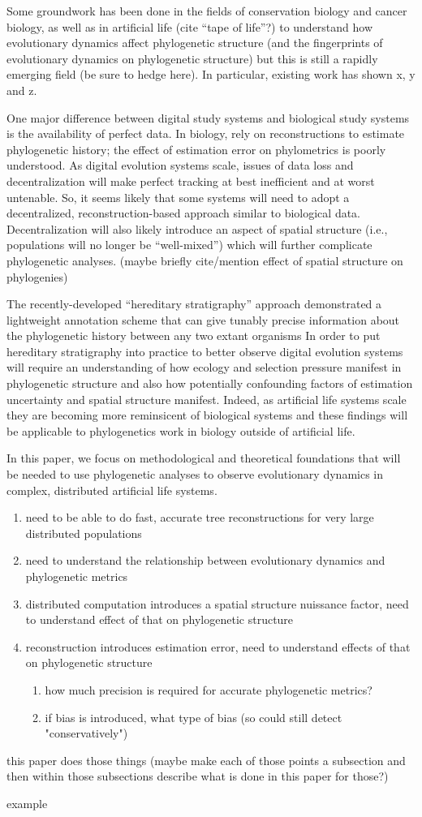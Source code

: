 Some groundwork has been done in the fields of conservation biology and cancer biology, as well as in artificial life (cite ``tape of life''?) to understand how evolutionary dynamics affect phylogenetic structure (and the fingerprints of evolutionary dynamics on phylogenetic structure) but this is still a rapidly emerging field (be sure to hedge here).
In particular, existing work has shown x, y and z.

One major difference between digital study systems and biological study systems is the availability of perfect data.
In biology, rely on reconstructions to estimate phylogenetic history; the effect of estimation error on phylometrics is poorly understood.
As digital evolution systems scale, issues of data loss and decentralization will make perfect tracking at best inefficient and at worst untenable.
So, it seems likely that some systems will need to adopt a decentralized, reconstruction-based approach similar to biological data.
Decentralization will also likely introduce an aspect of spatial structure (i.e., populations will no longer be ``well-mixed'') which will further complicate phylogenetic analyses.
(maybe briefly cite/mention effect of spatial structure on phylogenies)

The recently-developed ``hereditary stratigraphy'' approach demonstrated a lightweight annotation scheme that can give tunably precise information about the phylogenetic history between any two extant organisms
In order to put hereditary stratigraphy into practice to better observe digital evolution systems will require an understanding of how ecology and selection pressure manifest in phylogenetic structure and also how potentially confounding factors of estimation uncertainty and spatial structure manifest.
Indeed, as artificial life systems scale they are becoming more reminsicent of biological systems and these findings will be applicable to phylogenetics work in biology outside of artificial life.

In this paper, we focus on methodological and theoretical foundations that will be needed to use phylogenetic analyses to observe evolutionary dynamics in complex, distributed artificial life systems.
\begin{enumerate}
    \item need to be able to do fast, accurate tree reconstructions for very large distributed populations
    \item need to understand the relationship between evolutionary dynamics and phylogenetic metrics 
    \item distributed computation introduces a spatial structure nuissance factor, need to understand effect of that on phylogenetic structure
    \item reconstruction introduces estimation error, need to understand effects of that on phylogenetic structure
    \begin{enumerate}
        \item how much precision is required for accurate phylogenetic metrics?
        \item if bias is introduced, what type of bias (so could still detect "conservatively")
    \end{enumerate}
    \end{enumerate}

this paper does those things (maybe make each of those points a subsection and then within those subsections describe what is done in this paper for those?)

example \citep{gagliardi2019international}

